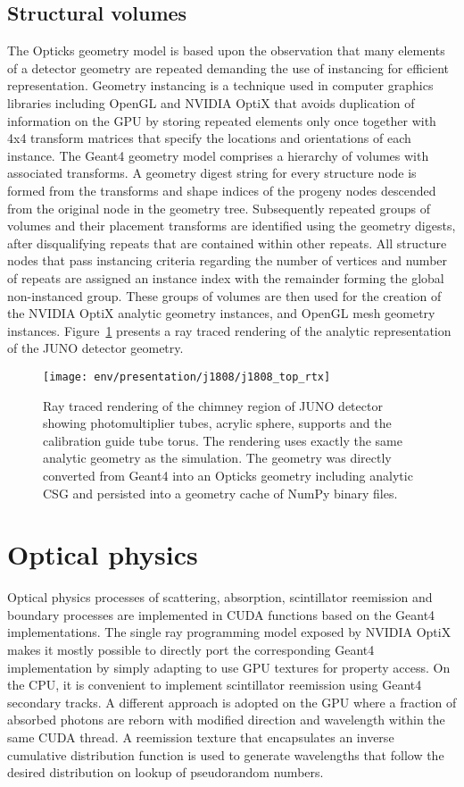 \documentclass{webofc}
\begin{document}
\subsection{Structural volumes}%
%
The Opticks geometry model is based upon the observation that many elements of a detector 
geometry are repeated demanding the use of instancing for efficient representation.  Geometry instancing 
is a technique used in computer graphics libraries including OpenGL and NVIDIA OptiX that avoids 
duplication of information on the GPU by storing repeated elements only once together with 4x4 transform matrices 
that specify the locations and orientations of each instance.
The Geant4 geometry model comprises a hierarchy of volumes with associated transforms. 
A geometry digest string for every structure node is formed from the transforms and shape indices of the progeny nodes descended from the original node in the geometry tree. 
Subsequently repeated groups of volumes and their placement transforms are identified using the geometry digests, after disqualifying repeats
that are contained within other repeats. 
All structure nodes that pass instancing criteria regarding the number of vertices and number of repeats are assigned an instance index
with the remainder forming the global non-instanced group. 
These groups of volumes are then used for the creation of the NVIDIA OptiX analytic geometry instances, and OpenGL mesh geometry instances.  
Figure~\ref{j1808} presents a ray traced rendering of the analytic representation of the JUNO detector geometry. 
%
%
%
\begin{figure}
\centering
\texttt{[image: env/presentation/j1808/j1808\_top\_rtx]}
\caption{Ray traced rendering of the chimney region of JUNO detector showing photomultiplier tubes, acrylic sphere, supports and the calibration guide tube torus. 
The rendering uses exactly the same analytic geometry as the simulation.
The geometry was directly converted from Geant4 into an Opticks geometry including analytic CSG 
and persisted into a geometry cache of NumPy\cite{numpy} binary files. 
}
\label{j1808} 
\end{figure}
%
%
\section{Optical physics}%
%
Optical physics processes of scattering, absorption, scintillator reemission and 
boundary processes are implemented in CUDA functions based on the Geant4
implementations. 
%
The single ray programming model exposed by NVIDIA OptiX makes it mostly possible 
to directly port the corresponding Geant4 implementation by simply 
adapting to use GPU textures for property access. 
%
On the CPU, it is convenient to implement scintillator reemission using Geant4 secondary 
tracks. A different approach is adopted on the GPU where a fraction of absorbed photons
are reborn with modified direction and wavelength within the same CUDA thread. 
A reemission texture that encapsulates an inverse cumulative distribution function 
is used to generate wavelengths that follow the desired distribution on lookup of pseudorandom numbers. 
%
%
\end{document}
